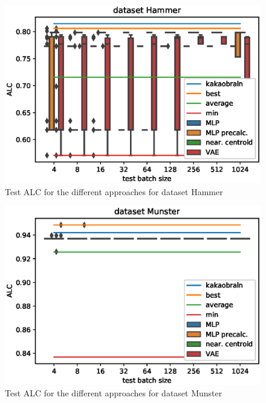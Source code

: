\documentclass{article}
\begin{document}
\begin{figure}[H]
\begin{center}
 	\includegraphics[width=0.99\linewidth]{../figures/16.eps} 
\end{center}
\caption{Test ALC for the different approaches for dataset Hammer}
\label{fig:16}
\end{figure} 
%
\begin{figure}[H]
\begin{center}
 	\includegraphics[width=0.99\linewidth]{../figures/13.eps} 
\end{center}
\caption{Test ALC for the different approaches for dataset Munster}
\label{fig:13}
\end{figure} 
%
\end{document}
